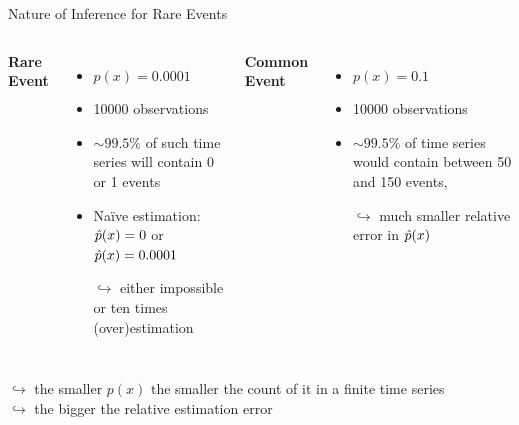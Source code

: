 \begin{frame}{Nature of Inference for Rare Events}
\begin{columns}[T]
\textbf{Rare Event} %
\begin{itemize}
  \item $p(x) = 0.0001$
  \item 10000 observations
  \item $\sim 99.5\%$ of such time series will contain 0 or 1 events
  \item Na\"ive estimation: $\hat{p}(x) = 0$ or $\hat{p}(x)=0.0001$
  \item[$\hookrightarrow$] either impossible or ten times (over)estimation
\end{itemize}
\textbf{Common Event} %
\begin{itemize}
  \item $p(x)=0.1$
  \item 10000 observations
  \item $\sim 99.5\%$ of time series would contain between 50 and 150 events,
  \item[]
  \item[]
  \item[$\hookrightarrow$] much smaller relative error in $\hat{p}(x)$
\end{itemize}
\end{columns}
\vspace{2em}
$\hookrightarrow$ the smaller $p(x)$ the smaller the count of it in a finite time series \\
$\hookrightarrow$ the bigger the relative estimation error
\end{frame}


